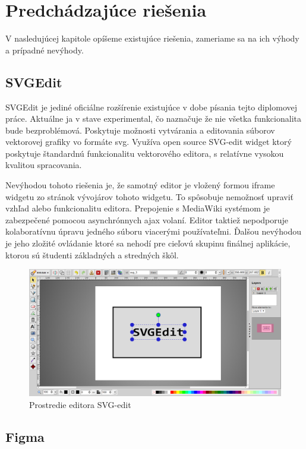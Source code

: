 \chapter{Predchádzajúce riešenia}\label{chap:previous_solutions}

V nasledujúcej kapitole opíšeme existujúce riešenia, zameriame sa na ich výhody a prípadné nevýhody.

\section{SVGEdit}

SVGEdit je jediné oficiálne rozšírenie existujúce v dobe písania tejto diplomovej práce. Aktuálne ja v stave experimental, čo naznačuje že nie všetka funkcionalita bude bezproblémová. Poskytuje možnosti vytvárania a editovania súborov vektorovej grafiky vo formáte svg. Využíva open source SVG-edit widget ktorý poskytuje štandardnú funkcionalitu vektorového editora, s relatívne vysokou kvalitou spracovania. 

Nevýhodou tohoto riešenia je, že samotný editor je vložený formou iframe widgetu zo stránok vývojárov tohoto widgetu. To spôsobuje nemožnosť upraviť vzhľad alebo funkcionalitu editora. Prepojenie s MediaWiki systémom je zabezpečené pomocou asynchrónnych ajax volaní. Editor taktiež nepodporuje kolaboratívnu úpravu jedného súboru viacerými používateľmi. Ďalšou nevýhodou je jeho zložité ovládanie ktoré sa nehodí pre cieľovú skupinu finálnej aplikácie, ktorou sú študenti základných a stredných škôl.

\begin{figure}[h]
	\centerline{\includegraphics[width=1\textwidth]{images/svg-edit}}
	\caption[Editor SVG-edit]{Prostredie editora SVG-edit}
	\label{obr:SVGedit}
\end{figure}
\FloatBarrier


\section{Figma}

